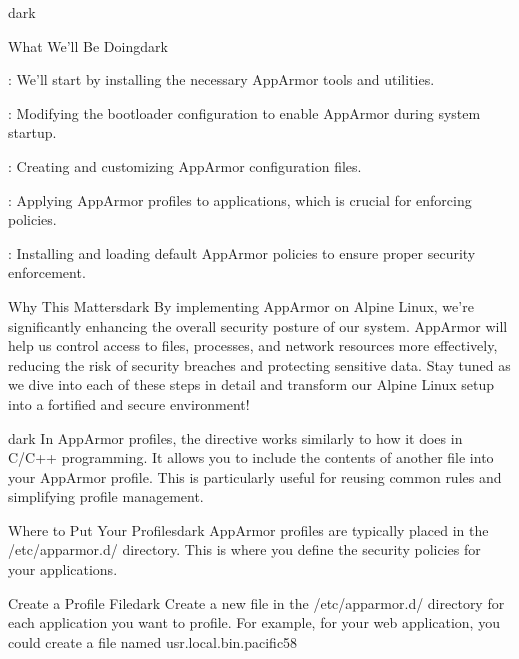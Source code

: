 \begin{baseBoxThree}{}{dark}
    \smallskip
    \begin{baseBoxThree}{What We'll Be Doing}{dark}
        \smallskip
        \begin{posnexItemize}
            \item[\sA] : We'll start by installing the necessary AppArmor tools and utilities.
            \item[\sA] : Modifying the bootloader configuration to enable AppArmor during system startup.
            \item[\sA] : Creating and customizing AppArmor configuration files.
            \item[\sA] : Applying AppArmor profiles to applications, which is crucial for enforcing policies.
            \item[\sA] : Installing and loading default AppArmor policies to ensure proper security enforcement.
        \end{posnexItemize}
        \smallskip
        \begin{baseBoxThree}{Why This Matters}{dark}
            \smallskip
            By implementing AppArmor on Alpine Linux, we're significantly enhancing the overall security posture of our system.
            AppArmor will help us control access to files, processes, and network resources more effectively, reducing the risk of security breaches and protecting sensitive data.
            Stay tuned as we dive into each of these steps in detail and transform our Alpine Linux setup into a fortified and secure environment!
            \smallskip
        \end{baseBoxThree}
        \smallskip
    \end{baseBoxThree}
    \smallskip
\end{baseBoxThree}

\begin{baseBoxThree}{}{dark}
    \bigskip
    In AppArmor profiles, the  directive works similarly to how it does in C/C++ programming.
    It allows you to include the contents of another file into your AppArmor profile.
    This is particularly useful for reusing common rules and simplifying profile management.
    \bigskip
    \begin{baseBoxThree}{Where to Put Your Profiles}{dark}
        \smallskip
        AppArmor profiles are typically placed in the /etc/apparmor.d/ directory. This is where you define the security policies for your applications.
        \smallskip
    \end{baseBoxThree}
    \smallskip
    \begin{baseBoxThree}{Create a Profile File}{dark}
        \smallskip
        Create a new file in the /etc/apparmor.d/ directory for each application you want to profile. For example, for your web application, you could create a file named usr.local.bin.pacific58
        \smallskip
    \end{baseBoxThree}
    \smallskip
\end{baseBoxThree}

